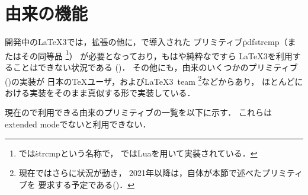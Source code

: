 \documentclass[a4paper,11pt,nomag,dvipdfmx]{jsarticle}
\begin{document}
\section{由来の機能}
開発中の\LaTeX 3では，\eTeX 拡張の他に，で導入された
プリミティブ\.{pdfstrcmp}（またはその同等品%
\footnote{では\.{strcmp}という名称で，
ではLuaを用いて実装されている．}）%
が必要となっており，もはや純粋な\eTeX ですら
\LaTeX 3を利用することはできない状況である (\cite{expl31,expl32,expl33})．
その他にも，由来のいくつかのプリミティブ(\cite{pdftexman})の実装が
日本の\TeX ユーザ，および\LaTeX3~team%
\footnote{%
  現在ではさらに状況が動き，
  2021年以降は，\LaTeXe 自体が本節で述べたプリミティブを
  要求する予定である(\cite{l2e31})．
}などからあり，
ほとんどにおける実装をそのまま真似する形で実装している．

現在の\epTeX で利用できる由来のプリミティブの一覧を以下に示す．
これらはextended modeでないと利用できない．
\end{document}

